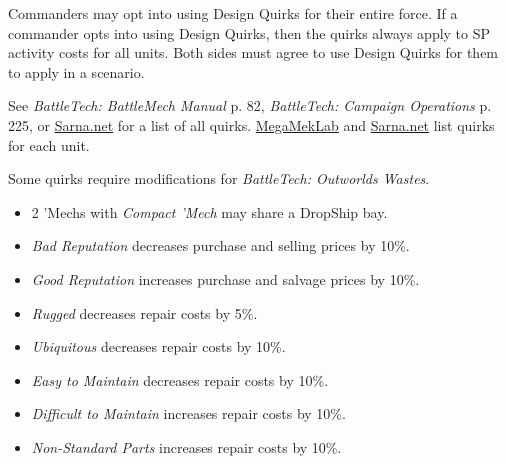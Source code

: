 Commanders may opt into using Design Quirks for their entire force.
If a commander opts into using Design Quirks, then the quirks always apply to SP activity costs for all units.
Both sides must agree to use Design Quirks for them to apply in a scenario.

See \emph{BattleTech: BattleMech Manual} p. 82, \emph{BattleTech: Campaign Operations} p. 225, or \href{https://sarna.net}{Sarna.net} for a list of all quirks.
\href{https://megamek.org}{MegaMekLab} and \href{https://sarna.net}{Sarna.net} list quirks for each unit.

Some quirks require modifications for \emph{BattleTech: Outworlds Wastes}.

\begin{itemize}

  \item 2 'Mechs with \emph{Compact 'Mech} may share a DropShip bay.

  \item \emph{Bad Reputation} decreases purchase and selling prices by 10\%.

  \item \emph{Good Reputation} increases purchase and salvage prices by 10\%.

  \item \emph{Rugged} decreases repair costs by 5\%.

  \item \emph{Ubiquitous} decreases repair costs by 10\%.

  \item \emph{Easy to Maintain} decreases repair costs by 10\%.

  \item \emph{Difficult to Maintain} increases repair costs by 10\%.

  \item \emph{Non-Standard Parts} increases repair costs by 10\%.

\end{itemize}
